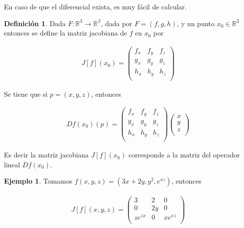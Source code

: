 \documentclass{article}
\theoremstyle{plain}
\theoremstyle{definition}
\newtheorem{defin}[thm]{Definición}
\newtheorem{ejem}[thm]{Ejemplo}
\begin{document}
En caso de que el diferencial exista, es muy fácil de calcular. \\

\begin{defin}Dada $F:\mathbb{R}^3 \to \mathbb{R^3}$, dada por $F = (f,g,h)$, y un punto $x_0 \in \mathbb{R}^3$ entonces se define la matriz jacobiana de $f$ en $x_0$ por
\end{defin}

\begin{align*}
    J[f](x_0) = \begin{pmatrix}
        {f}_x & {f}_y & {f}_z \\
        {g}_x & {g}_y & {g}_z \\
        {h}_x & {h}_y & {h}_z \\
    \end{pmatrix}
\end{align*}

Se tiene que si $p=(x,y,z)$, entonces

\begin{align*}
    Df(x_0)(p) = \begin{pmatrix}
        {f}_x & {f}_y & {f}_z \\
        {g}_x & {g}_y & {g}_z \\
        {h}_x & {h}_y & {h}_z \\
    \end{pmatrix} \begin{pmatrix}
        x \\
        y \\
        z \\
    \end{pmatrix}
\end{align*}

Es decir la matriz jacobiana $J[f](x_0)$ corresponde a la matriz del operador lineal $Df(x_0)$. \\

\begin{ejem}Tomamos $f(x,y,z) = (3x+2y,y^2, e^{xz})$, entonces
\end{ejem}

\begin{align*}
    J[f](x,y,z) = \begin{pmatrix}
        3 & 2 & 0 \\
        0 & 2y & 0 \\
        ze^{zx} & 0 & xe^{xz} \\
    \end{pmatrix}
\end{align*}
\end{document}
